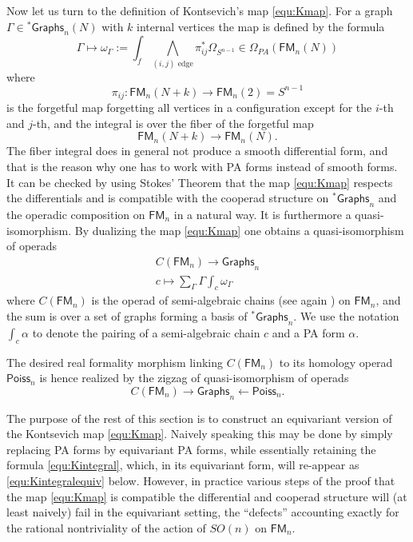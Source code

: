 \documentclass[a4paper]{amsart}
\theoremstyle{plain}
\theoremstyle{definition}
\newcommand{\Graphs}{{\mathsf{Graphs}}}
\newcommand{\Poiss}{{\mathsf{Poiss}}}
\newcommand{\FM}{\mathsf{FM}}
\newcommand{\stG}{{}^*\Graphs}
\newcommand{\SO}{\mathit{SO}}
\begin{document}
Now let us turn to the definition of Kontsevich's map \eqref{equ:Kmap}. 
For a graph $\Gamma\in \stG_n(N)$ with $k$ internal vertices the map is defined by the formula 
\begin{equation}\label{equ:Kintegral}
 \Gamma \mapsto \omega_\Gamma:= \int_f \bigwedge_{(i,j)\text{ edge}} \pi_{ij}^* \Omega_{S^{n-1}} \in \Omega_{PA}(\FM_n(N))
\end{equation}
where 
\[
\pi_{ij}: \FM_n(N+k) \to \FM_{n}(2)=S^{n-1}
\]
is the forgetful map forgetting all vertices in a configuration except for the $i$-th and $j$-th, and the integral is over the fiber of the forgetful map 
\[
 \FM_n(N+k) \to \FM_n(N).
\]
The fiber integral does in general not produce a smooth differential form, and that is the reason why one has to work with PA forms instead of smooth forms.
It can be checked by using Stokes' Theorem that the map \eqref{equ:Kmap} respects the differentials and is compatible with the cooperad structure on $\stG_n$ and the operadic composition on $\FM_n$ in a natural way. It is furthermore a quasi-isomorphism.
By dualizing the map \eqref{equ:Kmap} one obtains a quasi-isomorphism of operads
\begin{gather*}
 C(\FM_n) \to \Graphs_n \\
 c\mapsto \sum_{\Gamma} \Gamma \int_c \omega_{\Gamma}
\end{gather*}
where $C(\FM_n)$ is the operad of semi-algebraic chains (see again \cite{HLTV}) on $\FM_n$, and the sum is over a set of graphs forming a basis of $\stG_n$. We use the notation $\int_c \alpha$ to denote the pairing of a semi-algebraic chain $c$ and a PA form $\alpha$.

The desired real formality morphism linking $C(\FM_n)$ to its homology operad $\Poiss_n$ is hence realized by the zigzag of quasi-isomorphism of operads
\[
 C(\FM_n) \to \Graphs_n \leftarrow \Poiss_n.
\]

The purpose of the rest of this section is to construct an equivariant version of the Kontsevich map \eqref{equ:Kmap}. Naively speaking this may be done by simply replacing PA forms by equivariant PA forms, while essentially retaining the formula \eqref{equ:Kintegral}, which, in its equivariant form, will re-appear as \eqref{equ:Kintegralequiv} below. However, in practice various steps of the proof that the map \eqref{equ:Kmap} is compatible the differential and cooperad structure will (at least naively) fail in the equivariant setting, the ``defects'' accounting exactly for the rational nontriviality of the action of $\SO(n)$ on $\FM_n$.
\end{document}
